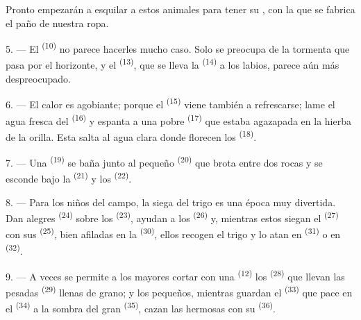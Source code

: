 Pronto empezarán a esquilar a estos animales para tener su ,
con la que se fabrica el paño de nuestra ropa.

\VUsaut{5.0mm}
\VUsaut{3.4mm}

5. --- El  \textsuperscript{(10)} no parece hacerles mucho caso. Solo
se preocupa de la tormenta que pasa por el horizonte, y el
 \textsuperscript{(13)}, que se lleva la 
\textsuperscript{(14)} a los labios, parece aún más despreocupado.

6. --- El calor es agobiante; porque el  \textsuperscript{(15)} viene
también a refrescarse; lame el agua fresca del 
\textsuperscript{(16)} y espanta a una pobre  \textsuperscript{(17)} que estaba
agazapada en la hierba de la orilla. Esta salta al agua clara donde
florecen los  \textsuperscript{(18)}.

7. --- Una  \textsuperscript{(19)} se baña junto al pequeño
 \textsuperscript{(20)} que brota entre dos rocas y se esconde bajo
la  \textsuperscript{(21)} y los  \textsuperscript{(22)}.

\VUsaut{5.0mm}
\VUsaut{3.4mm}

8. --- Para los niños del campo, la siega del trigo es una época muy
divertida. Dan alegres  \textsuperscript{(24)} sobre los
 \textsuperscript{(23)}, ayudan a los 
\textsuperscript{(26)} y, mientras estos siegan el  \textsuperscript{(27)} con
sus  \textsuperscript{(25)}, bien afiladas en la  \textsuperscript{(30)}, ellos recogen el trigo y lo atan en 
\textsuperscript{(31)} o en  \textsuperscript{(32)}.

9. --- A veces se permite a los mayores cortar con una 
\textsuperscript{(12)} los  \textsuperscript{(28)} que llevan las
pesadas  \textsuperscript{(29)} llenas de grano; y los pequeños,
mientras guardan el  \textsuperscript{(33)} que pace en el
 \textsuperscript{(34)} a la sombra del gran  \textsuperscript{(35)},
cazan las hermosas  con su  \textsuperscript{(36)}.

